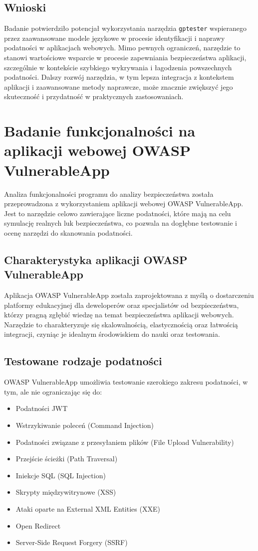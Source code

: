 \section{Wnioski}

Badanie potwierdziło potencjał wykorzystania narzędzia \texttt{gptester} wspieranego przez zaawansowane modele językowe w procesie identyfikacji i naprawy podatności w aplikacjach webowych. Mimo pewnych ograniczeń, narzędzie to stanowi wartościowe wsparcie w procesie zapewniania bezpieczeństwa aplikacji, szczególnie w kontekście szybkiego wykrywania i łagodzenia powszechnych podatności. Dalszy rozwój narzędzia, w tym lepsza integracja z kontekstem aplikacji i zaawansowane metody naprawcze, może znacznie zwiększyć jego skuteczność i przydatność w praktycznych zastosowaniach.

\chapter{Badanie funkcjonalności na aplikacji webowej OWASP VulnerableApp}
\label{sec:badania_na_aplikacji_webowej_owasp}

Analiza funkcjonalności programu do analizy bezpieczeństwa została przeprowadzona z wykorzystaniem aplikacji webowej OWASP VulnerableApp. Jest to narzędzie celowo zawierające liczne podatności, które mają na celu symulację realnych luk bezpieczeństwa, co pozwala na dogłębne testowanie i ocenę narzędzi do skanowania podatności.

\section{Charakterystyka aplikacji OWASP VulnerableApp}
Aplikacja OWASP VulnerableApp została zaprojektowana z myślą o dostarczeniu platformy edukacyjnej dla deweloperów oraz specjalistów od bezpieczeństwa, którzy pragną zgłębić wiedzę na temat bezpieczeństwa aplikacji webowych. Narzędzie to charakteryzuje się skalowalnością, elastycznością oraz łatwością integracji, czyniąc je idealnym środowiskiem do nauki oraz testowania.

\section{Testowane rodzaje podatności}
OWASP VulnerableApp umożliwia testowanie szerokiego zakresu podatności, w tym, ale nie ograniczając się do:
\relax
\begin{itemize}
    \item Podatności JWT
    \item Wstrzykiwanie poleceń (Command Injection)
    \item Podatności związane z przesyłaniem plików (File Upload Vulnerability)
    \item Przejście ścieżki (Path Traversal)
    \item Iniekcje SQL (SQL Injection)
    \item Skrypty międzywitrynowe (XSS)
    \item Ataki oparte na External XML Entities (XXE)
    \item Open Redirect
    \item Server-Side Request Forgery (SSRF)
\end{itemize}

